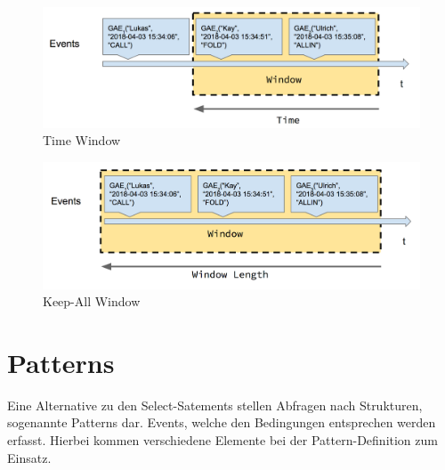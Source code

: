 \begin{figure}[ht]
	\centering
	\includegraphics[width=\textwidth,height=\textheight,keepaspectratio]{images/data_window_time.png}
	\caption{Time Window}
	\label{TimeWindow}
\end{figure}

\begin{figure}[ht]
	\centering
	\includegraphics[width=\textwidth,height=\textheight,keepaspectratio]{images/data_window_keep_all.png}
	\caption{Keep-All Window}
	\label{KeepAllWindow}
\end{figure}

\section{Patterns}

Eine Alternative zu den Select-Satements stellen Abfragen nach Strukturen, sogenannte Patterns dar. Events, welche den Bedingungen entsprechen werden erfasst. Hierbei kommen verschiedene Elemente bei der Pattern-Definition zum Einsatz.

